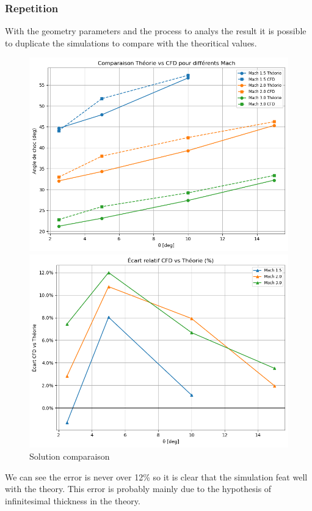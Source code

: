 \subsubsection{Repetition}
With the geometry parameters and the process to analys the result it is possible to duplicate the simulations to compare with the theoritical values.

\begin{figure}[H]
    \centering
    \begin{minipage}[b]{0.45\linewidth}
        \centering
		\includegraphics[width=1\linewidth]{ressources/figures/sol1.png}
    \end{minipage}
    \begin{minipage}[b]{0.45\linewidth}
        \centering
		\includegraphics[width=1\linewidth]{ressources/figures/sol2.png}
    \end{minipage}
	\caption{Solution comparaison}
    \label{fig:sol}
\end{figure}

We can see the error is never over 12\% so it is clear that the simulation feat well with the theory. This error is probably mainly due to the hypothesis of infinitesimal thickness in the theory.

